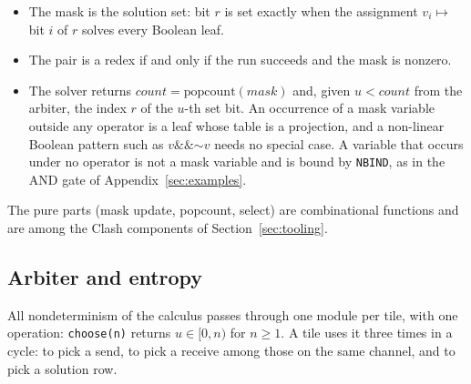 \documentclass[10.5pt,a4paper]{extarticle}
\newcommand{\kw}[1]{\texttt{#1}}
\newcommand{\bnot}{\mathord{\sim}}
\newcommand{\band}{\mathbin{\&\&}}
\theoremstyle{definition}
\theoremstyle{remark}
\begin{document}
\begin{itemize}
\item The mask is the solution set: bit $r$ is set exactly when the
assignment $v_i \mapsto$ bit $i$ of $r$ solves every Boolean leaf.
\item The pair is a redex if and only if the run succeeds and the mask is
nonzero.
\item The solver returns $\mathit{count} = \mathrm{popcount}(\mathit{mask})$
and, given $u < \mathit{count}$ from the arbiter, the index $r$ of the
$u$-th set bit. An occurrence of a mask variable outside any operator is a leaf whose table
is a projection, and a non-linear Boolean pattern such as
$v \band \bnot v$ needs no special case. A variable that occurs under no
operator is not a mask variable and is bound by \kw{NBIND}, as in the AND gate
of Appendix~\ref{sec:examples}.
\end{itemize}
The pure parts (mask update, popcount, select) are combinational functions
and are among the Clash components of Section~\ref{sec:tooling}.

\subsection{Arbiter and entropy}\label{sec:arbiter}

All nondeterminism of the calculus passes through one module per tile, with
one operation: \kw{choose(n)} returns $u \in [0,n)$ for $n \ge 1$. A tile
uses it three times in a cycle: to pick a send, to pick a receive among those
on the same channel, and to pick a solution row.
\end{document}
